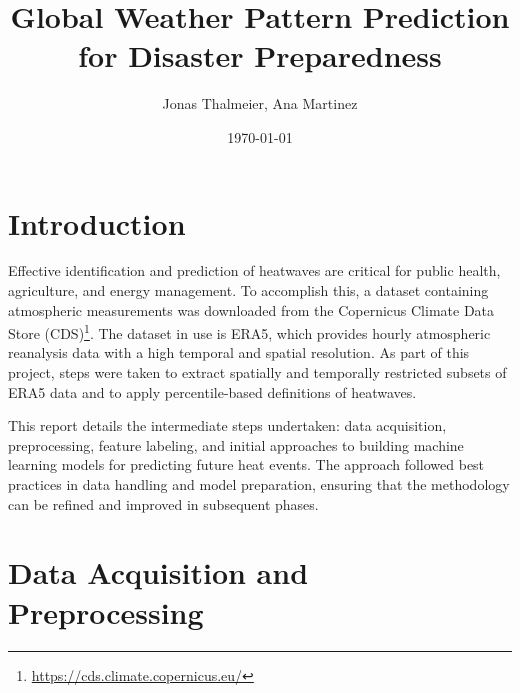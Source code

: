 \documentclass[8pt,a4paper]{article}
\title{Global Weather Pattern Prediction for Disaster Preparedness}
\author{Jonas Thalmeier, Ana Martinez}
\date{\today}
\begin{document}
\maketitle


\section{Introduction}
Effective identification and prediction of heatwaves are critical for public health, agriculture, and energy management. To accomplish this, a dataset containing atmospheric measurements was downloaded from the Copernicus Climate Data Store (CDS)\footnote{\url{https://cds.climate.copernicus.eu/}}. The dataset in use is ERA5, which provides hourly atmospheric reanalysis data with a high temporal and spatial resolution. As part of this project, steps were taken to extract spatially and temporally restricted subsets of ERA5 data and to apply percentile-based definitions of heatwaves.

This report details the intermediate steps undertaken: data acquisition, preprocessing, feature labeling, and initial approaches to building machine learning models for predicting future heat events. The approach followed best practices in data handling and model preparation, ensuring that the methodology can be refined and improved in subsequent phases.

\section{Data Acquisition and Preprocessing}
\end{document}
